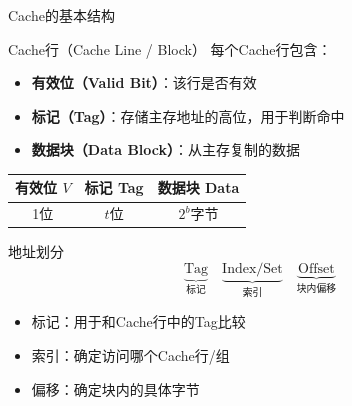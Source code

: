 \documentclass[10pt, aspectratio=169]{beamer}
\begin{document}
\begin{frame}{Cache的基本结构}
    \begin{block}{Cache行（Cache Line / Block）}
        每个Cache行包含：
        \begin{itemize}
            \item \textbf{有效位（Valid Bit）}：该行是否有效
            \item \textbf{标记（Tag）}：存储主存地址的高位，用于判断命中
            \item \textbf{数据块（Data Block）}：从主存复制的数据
        \end{itemize}
    \end{block}
    \vspace{0.3em}
    \begin{center}
        \begin{tabular}{|c|c|c|}
            \hline
            有效位 $V$ & 标记 Tag & 数据块 Data \\
            \hline
            1位 & $t$位 & $2^b$字节 \\
            \hline
        \end{tabular}
    \end{center}
    \vspace{0.3em}
    \begin{exampleblock}{地址划分}
        \[
            \underbrace{\text{Tag}}_{\text{标记}} \quad
            \underbrace{\text{Index/Set}}_{\text{索引}} \quad
            \underbrace{\text{Offset}}_{\text{块内偏移}}
        \]
        \begin{itemize}
            \item 标记：用于和Cache行中的Tag比较
            \item 索引：确定访问哪个Cache行/组
            \item 偏移：确定块内的具体字节
        \end{itemize}
    \end{exampleblock}
\end{frame}
\end{document}

